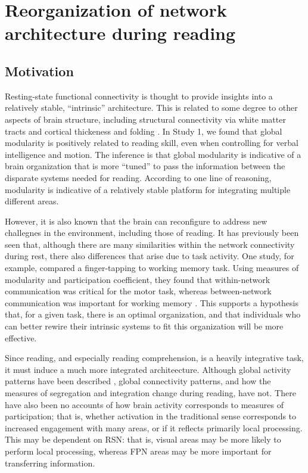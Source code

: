 \chapter{Reorganization of network architecture during reading}

\section{Motivation}

Resting-state functional connectivity is thought to provide insights into a relatively stable, ``intrinsic'' architecture. This is related to some degree to other aspects of brain structure, including structural connectivity via white matter tracts and cortical thickeness and folding \citep{}. In Study 1, we found that global modularity is positively related to reading skill, even when controlling for verbal intelligence and motion. The inference is that global modularity is indicative of a brain organization that is more ``tuned'' to pass the information between the disparate systems needed for reading. According to one line of reasoning, modularity is indicative of a relatively stable platform for integrating multiple different areas. 

However, it is also known that the brain can reconfigure to address new challegnes in the environment, including those of reading. It has previously been seen that, although there are many similarities within the network connectivity during rest, there also differences that arise due to task activity. One study, for example, compared a finger-tapping to working memory task. Using measures of modularity and participation coefficient, they found that within-network communication was critical for the motor task, whereas between-network communication was important for working memory \citep{CohenEsposito}. This supports a hypothesis that, for a given task, there is an optimal organization, and that individuals who can better rewire their intrinsic systems to fit this organization will be more effective. 

Since reading, and especially reading comprehension, is a heavily integrative task, it must induce a much more integrated architeecture. Although global activity patterns have been described \citep{Rimrodt2008, Xu2006}, global connectivity patterns, and how the measures of segregation and integration change during reading, have not. There have also been no accounts of how brain activity corresponds to measures of participation; that is, whether activation in the traditional sense corresponds to increased engagement with many areas, or if it reflects primarily local processing. This may be dependent on RSN: that is, visual areas may be more likely to perform local processing, whereas FPN areas may be more important for transferring information. 

